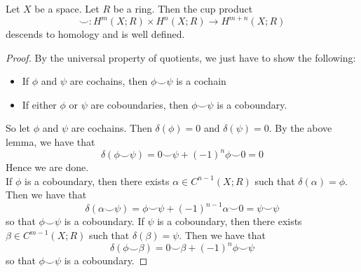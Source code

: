 \documentclass[a4paper]{article}
\begin{document}
\begin{prp}{}{} Let $X$ be a space. Let $R$ be a ring. Then the cup product $$\smile:H^m(X;R)\times H^n(X;R)\to H^{m+n}(X;R)$$ descends to homology and is well defined. 
\begin{proof}
By the universal property of quotients, we just have to show the following: 
\begin{itemize}
\item If $\phi$ and $\psi$ are cochains, then $\phi\smile\psi$ is a cochain
\item If either $\phi$ or $\psi$ are coboundaries, then $\phi\smile\psi$ is a coboundary. 
\end{itemize}
So let $\phi$ and $\psi$ are cochains. Then $\delta(\phi)=0$ and $\delta(\psi)=0$. By the above lemma, we have that $$\delta(\phi\smile\psi)=0\smile\psi+(-1)^n\phi\smile 0=0$$ Hence we are done. \\

If $\phi$ is a coboundary, then there exists $\alpha\in C^{n-1}(X;R)$ such that $\delta(\alpha)=\phi$. Then we have that $$\delta(\alpha\smile\psi)=\phi\smile\psi+(-1)^{n-1}\alpha\smile 0=\psi\smile\psi$$ so that $\phi\smile\psi$ is a coboundary. If $\psi$ is a coboundary, then there exists $\beta\in C^{m-1}(X;R)$ such that $\delta(\beta)=\psi$. Then we have that $$\delta(\phi\smile\beta)=0\smile\beta+(-1)^n\phi\smile\psi$$ so that $\phi\smile\psi$ is a coboundary. 
\end{proof}
\end{prp}
\end{document}
